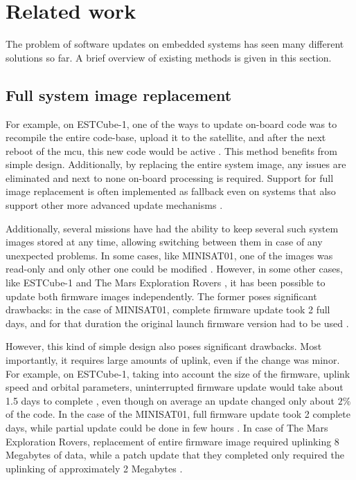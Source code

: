 \newpage
\section{Related work}
\label{s:relatedwork}

The problem
of software updates on embedded systems has seen many different solutions so far. A brief overview of existing methods is given in this section.

\subsection{Full system image replacement}

For example, on ESTCube-1, one of the ways to update on-board code was to recompile the entire code-base, upload it to the satellite, and after the next reboot of the \gls{mcu}, this new code would be active \cite{Suenter2016}. This method benefits from simple design. Additionally, by replacing the entire system image, any
 issues are eliminated and next to none on-board processing is required. Support for full image replacement is often implemented as fallback even on systems that also support other more advanced update mechanisms \cite{Tarbe2013,Greco2005,Garrido1998}.

Additionally, several missions have had the ability to keep several such system images stored at any time, allowing switching between them in case of any unexpected problems. In some cases, like MINISAT01, one of the images was read-only and only other one could be modified \cite{Garrido1998}. However, in some other cases, like  ESTCube-1 \cite{Tarbe2013} and The Mars Exploration Rovers \cite{Greco2005}, it has been possible to update both firmware images independently. The former poses significant drawbacks: in the case of MINISAT01, complete firmware update took 2 full days, and for that duration the original launch firmware version had to be used \cite{Garrido1998}.

However, this kind of simple design also poses significant drawbacks. Most importantly, it requires large amounts of uplink, even if the change was minor. For example, on ESTCube-1, taking into account the size of the firmware, uplink speed and orbital parameters, uninterrupted firmware update would take about 1.5 days to complete \cite{Suenter2014}, even though on average an update changed only about $2\%$ of the code. In the case of the MINISAT01, full firmware update took 2 complete days, while partial update could be done in few hours \cite{Garrido1998}. In case of The Mars Exploration Rovers, replacement of entire firmware image required uplinking 8 Megabytes of data, while a patch update that they completed only required the uplinking of approximately 2 Megabytes \cite{Greco2005}.

